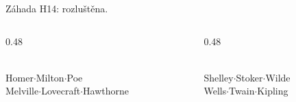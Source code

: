 \documentclass[aspectratio=169,10pt]{beamer}
\begin{document}
\begin{frame}[t]{Záhada H14: rozluštěna.}
  \begin{columns}[T,onlytextwidth]
    \begin{column}{0.48\textwidth}
      \begin{plusbox}
        \\[1.5mm]
        {\footnotesize\color{mutedText} Homer\;$\cdot$\;Milton\;$\cdot$\;Poe\\ Melville\;$\cdot$\;Lovecraft\;$\cdot$\;Hawthorne}
      \end{plusbox}
    \end{column}
    \begin{column}{0.48\textwidth}
      \begin{minusbox}
        \\[1.5mm]
        {\footnotesize\color{mutedText} Shelley\;$\cdot$\;Stoker\;$\cdot$\;Wilde\\ Wells\;$\cdot$\;Twain\;$\cdot$\;Kipling}
      \end{minusbox}
    \end{column}
  \end{columns}
\end{frame}
\end{document}
